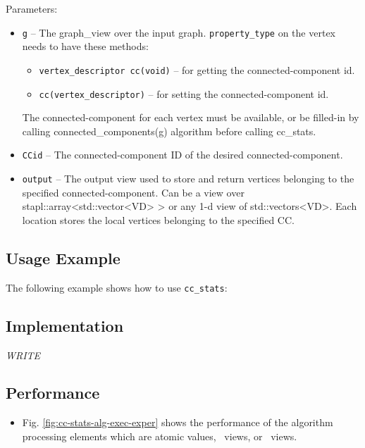 Parameters:
\begin{itemize}
\item
\texttt{g} --
The graph\_view over the input graph. 
\texttt{property\_type}%
on the vertex needs to have these methods: 
\begin{itemize}
\item
\texttt{vertex\_descriptor cc(void)} --
 for getting the connected-component id. 
\item
\texttt{cc(vertex\_descriptor)} --
 for setting the connected-component id. 
\end{itemize}
The connected-component for each vertex must be available, or be filled-in by calling connected\_components(g) algorithm before calling cc\_stats.
\item
\texttt{CCid} --
The connected-component ID of the desired connected-component.
\item
\texttt{output} --
The output view used to store and return vertices belonging to the specified connected-component. Can be a view over stapl::array<std::vector<VD> > or any 1-d view of std::vectors<VD>. Each location stores the local vertices belonging to the specified CC.
\end{itemize}

\subsection{Usage Example} \label{sec-conn-comp-stats-alg-use}

The following example shows how to use 
\texttt{cc\_stats}:
 

\subsection{Implementation} \label{sec-conn-comp-stats-alg-impl}

\textit{WRITE}

\subsection{Performance} \label{sec-conn-comp-stats-alg-perf}

\begin{itemize}
\item
Fig. \ref{fig:cc-stats-alg-exec-exper}
shows the performance of the algorithm processing
elements which are atomic values, \stl\ views, or \stapl\ views.
\end{itemize}

